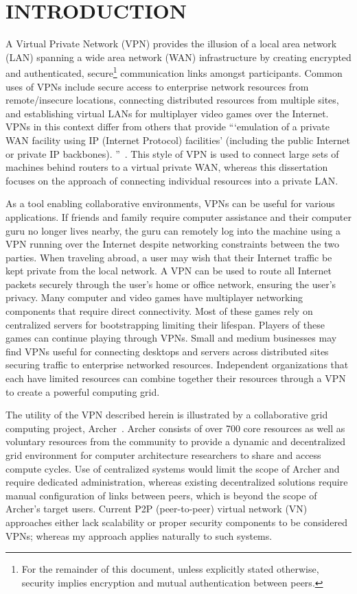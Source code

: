 \chapter{INTRODUCTION}
\label{introduction}

A Virtual Private Network (VPN) provides the illusion of a local area network
(LAN) spanning a wide area network (WAN) infrastructure by creating encrypted
and authenticated, secure\footnote{For the remainder of this document, unless
explicitly stated otherwise, security implies encryption and mutual
authentication between peers.} communication links amongst participants.
Common uses of VPNs include secure access to enterprise network resources from
remote/insecure locations, connecting distributed resources from multiple
sites, and establishing virtual LANs for multiplayer video games over the
Internet.  VPNs in this context differ from others that provide ```emulation of
a private WAN facility using IP (Internet Protocol) facilities' (including the
public Internet or private IP backbones).  ''~\cite{ip_vpns}.  This style of
VPN is used to connect large sets of machines behind routers to a virtual
private WAN, whereas this dissertation focuses on the approach of connecting
individual resources into a private LAN.

As a tool enabling collaborative environments, VPNs can be useful for various
applications.  If friends and family require computer assistance and their
computer guru no longer lives nearby, the guru can remotely log into the
machine using a VPN running over the Internet despite networking constraints
between the two parties.  When traveling abroad, a user may wish that their
Internet traffic be kept private from the local network.  A VPN can be used to
route all Internet packets securely through the user's home or office network,
ensuring the user's privacy.  Many computer and video games have multiplayer
networking components that require direct connectivity.  Most of these games
rely on centralized servers for bootstrapping limiting their lifespan.  Players
of these games can continue playing through VPNs.  Small and medium businesses
may find VPNs useful for connecting desktops and servers across distributed
sites securing traffic to enterprise networked resources.  Independent
organizations that each have limited resources can combine together their
resources through a VPN to create a powerful computing grid.

The utility of the VPN described herein is illustrated by a collaborative grid
computing project, Archer~\cite{archer}.  Archer consists of over 700 core
resources as well as voluntary resources from the community to provide a
dynamic and decentralized grid environment for computer architecture
researchers to share and access compute cycles.  Use of centralized systems
would limit the scope of Archer and require dedicated administration, whereas
existing decentralized solutions require manual configuration of links between
peers, which is beyond the scope of Archer's target users.  Current P2P
(peer-to-peer) virtual network (VN) approaches either lack scalability or
proper security components to be considered VPNs; whereas my approach applies
naturally to such systems.

